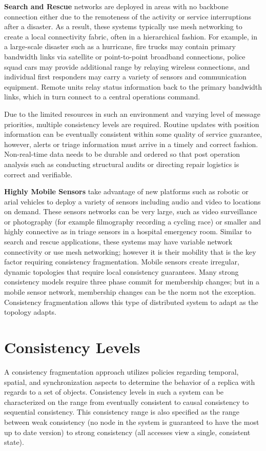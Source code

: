 \documentclass[letterpaper,twocolumn,10pt]{article}
\begin{document}
\textbf{Search and Rescue} networks are deployed in areas with no backbone connection either due to the remoteness of the activity or service interruptions after a disaster. As a result, these systems typically use mesh networking to create a local connectivity fabric, often in a hierarchical fashion. For example, in a large-scale disaster such as a hurricane, fire trucks may contain primary bandwidth links via satellite or point-to-point broadband connections, police squad cars may provide additional range by relaying wireless connections, and individual first responders may carry a variety of sensors and communication equipment. Remote units relay status information back to the primary bandwidth links, which in turn connect to a central operations command.

Due to the limited resources in such an environment and varying level of message priorities, multiple consistency levels are required. Routine updates with position information can be eventually consistent within some quality of service guarantee, however, alerts or triage information must arrive in a timely and correct fashion. Non-real-time data needs to be durable and ordered so that post operation analysis such as conducting structural audits or directing repair logistics is correct and verifiable.

\textbf{Highly Mobile Sensors} take advantage of new platforms such as robotic or arial vehicles to deploy a variety of sensors including audio and video to locations on demand. These sensors networks can be very large, such as video surveillance or photography (for example filmography recording a cycling race) or smaller and highly connective as in triage sensors in a hospital emergency room. Similar to search and rescue applications, these systems may have variable network connectivity or use mesh networking; however it is their mobility that is the key factor requiring consistency fragmentation. Mobile sensors create irregular, dynamic topologies that require local consistency guarantees. Many strong consistency models require three phase commit for membership changes; but in a mobile sensor network, membership changes can be the norm not the exception. Consistency fragmentation allows this type of distributed system to adapt as the topology adapts.

\section{Consistency Levels}

A consistency fragmentation approach utilizes policies regarding temporal, spatial, and synchronization aspects to determine the behavior of a replica with regards to a set of objects. Consistency levels in such a system can be characterized on the range from eventually consistent to causal consistency to sequential consistency. This consistency range is also specified as the range between weak consistency (no node in the system is guaranteed to have the most up to date version) to strong consistency (all accesses view a single, consistent state).
\end{document}
